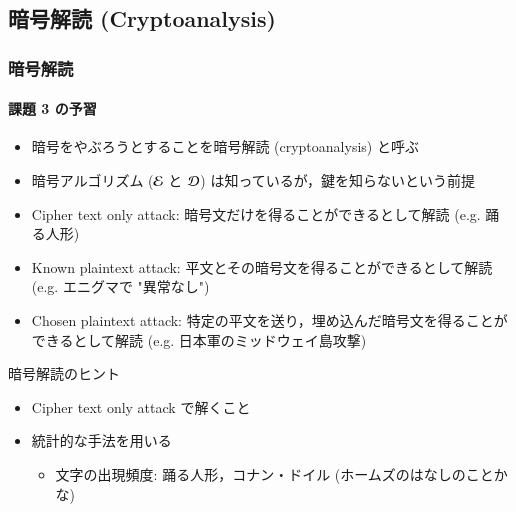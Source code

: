 \subsection{暗号解読 (Cryptoanalysis)}
\begin{frame}
\frametitle{暗号解読}
\framesubtitle{課題 3 の予習}
  \begin{itemize}
\item 暗号をやぶろうとすることを暗号解読 (cryptoanalysis) と呼ぶ
\item 暗号アルゴリズム (\(\cal E\) と \(\cal D\)) は知っているが，鍵を知らないという前提
\item Cipher text only attack: 暗号文だけを得ることができるとして解読 (e.g. 踊る人形)
\item Known plaintext attack: 平文とその暗号文を得ることができるとして解読 (e.g. エニグマで "異常なし")
\item Chosen plaintext attack: 特定の平文を送り，埋め込んだ暗号文を得ることができるとして解読 (e.g. 日本軍のミッドウェイ島攻撃)
  \end{itemize}
  \begin{block}{暗号解読のヒント}
    \begin{itemize}
\item Cipher text only attack で解くこと
\item 統計的な手法を用いる
      \begin{itemize}
\item 文字の出現頻度: 踊る人形，コナン・ドイル (ホームズのはなしのことかな)
      \end{itemize}
    \end{itemize}
  \end{block}
\end{frame}
